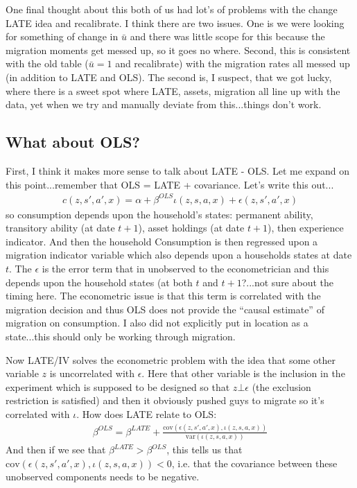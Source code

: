 \documentclass[pdftex,11pt]{article}
\begin{document}
One final thought about this both of us had lot's of problems with the change LATE idea and recalibrate. I think there are two issues. One is we were looking for something of change in $\bar u$ and there was little scope for this because the migration moments get messed up, so it goes no where. Second, this is consistent with the old table ($\bar u = 1$ and recalibrate) with the migration rates all messed up (in addition to LATE and OLS). The second is, I suspect, that we got lucky, where there is a sweet spot where LATE, assets, migration all line up with the data, yet when we try and manually deviate from this...things don't work. 

\subsection{What about OLS?}

First, I think it makes more sense to talk about LATE - OLS. Let me expand on this point...remember that OLS = LATE + covariance. Let's write this out...
\begin{align}
c(z,s',a',x) = \alpha + \beta^{OLS} \iota(z,s,a,x) + \epsilon(z,s',a',x)
\end{align}
so consumption depends upon the household's states: permanent ability, transitory ability (at date $t+1$), asset holdings (at date $t+1$), then experience indicator. And then the household Consumption is then regressed upon a migration indicator variable which also depends upon a households states at date $t$.  The $\epsilon$ is the error term that in unobserved to the econometrician and this depends upon the household states (at both $t$ and $t+1$?...not sure about the timing here. The econometric issue is that this term is correlated with the migration decision and thus OLS does not provide the ``causal estimate'' of migration on consumption. I also did not explicitly put in location as a state...this should only be working through migration.

Now LATE/IV solves the econometric problem with the idea that some other variable $z$ is uncorrelated with $\epsilon$. Here that other variable is the inclusion in the experiment which is supposed to be designed so that $z \bot  \epsilon$ (the exclusion restriction is satisfied) and then it obviously pushed guys to migrate so it's correlated with $\iota$. How does LATE relate to OLS:
\begin{align}
\beta^{OLS} = \beta^{LATE} + \frac{\mathrm{cov}( \epsilon(z,s',a',x), \iota(z,s,a,x))} {\mathrm{var}(\iota(z,s,a,x))}
\end{align}
And then if we see that $\beta^{LATE} > \beta^{OLS}$, this tells us that $\mathrm{cov}( \epsilon(z,s',a',x), \iota(z,s,a,x)) < 0$, i.e. that the covariance between these unobserved components needs to be negative.
\end{document}
